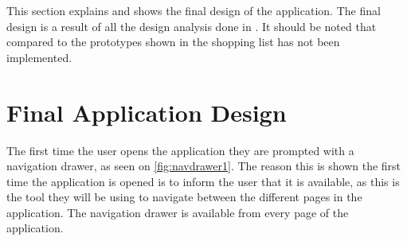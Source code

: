 This section explains and shows the final design of the application. The final design is a result of all the design analysis done in . It should be noted that compared to the prototypes shown in  the shopping list has not been implemented.

\section{Final Application Design}
The first time the user opens the application they are prompted with a navigation drawer, as seen on \autoref{fig:navdrawer1}. The reason this is shown the first time the application is opened is to inform the user that it is available, as this is the tool they will be using to navigate between the different pages in the application. The navigation drawer is available from every page of the application.

